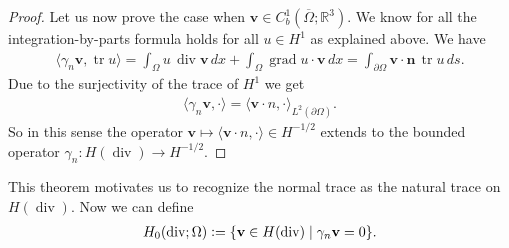 \documentclass[12pt,a4paper]{article}
\numberwithin{equation}{subsection}
\numberwithin{lemma}{subsection}
\newtheorem{proposition}[lemma]{Proposition}
\theoremstyle{definition}
\DeclareMathOperator{\diver}{div}
\DeclareMathOperator{\grad}{grad}
\DeclareMathOperator{\tr}{tr}
\newcommand{\naturalnum}{\mathbb{N}}
\newcommand{\real}{\mathbb{R}}
\begin{document}
\begin{proof}
    Let us now prove the case when $\mathbf{v} \in C_b^1(\overline{\Omega}; \real^3)$.
    We know for all the integration-by-parts formula holds for all $u \in H^1$ as 
    explained above. We have
    \begin{align*}
        \langle \gamma_n \mathbf{v}, \tr u \rangle = 
        \int_\Omega u \, \diver \mathbf{v} \, dx 
            + \int_\Omega \grad u \cdot \mathbf{v} \, dx
        = \int_{\partial \Omega} \mathbf{v}\cdot \mathbf{n} \, \tr u \, ds.
    \end{align*}
    Due to the surjectivity of the trace of $H^1$ we get 
    \begin{align*}
        \langle \gamma_n \mathbf{v}, \cdot \rangle = \langle \mathbf{v} \cdot n, \cdot \rangle_{L^2(\partial\Omega)}.
    \end{align*}
    So in this sense the operator $\mathbf{v} \mapsto \langle \mathbf{v} \cdot n, \cdot \rangle 
    \in H^{-1/2}$ extends to the bounded operator $\gamma_n: H(\diver) \rightarrow H^{-1/2}$.
\end{proof}
This theorem motivates us to recognize the normal trace as the natural trace 
on $H(\diver)$. Now we can define 
\begin{align*}
    H_0(\diver;\Omega) \vcentcolon= \{ \mathbf{v} \in H(\diver) \mid \gamma_n \mathbf{v}=0 \}.
\end{align*}

\end{document}
